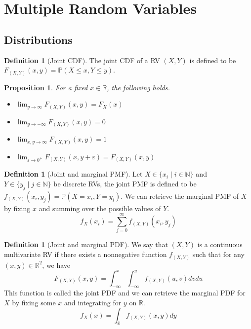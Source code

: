 \documentclass[paper=a4, fontsize=12pt]{scrartcl} %
\newtheorem{prop}[thm]{Proposition}
\theoremstyle{definition}
\newtheorem{defn}[thm]{Definition}
\theoremstyle{remark}
\newcommand{\R}{\mathbb{R}}
\newcommand{\N}{\mathbb{N}}
\renewcommand{\P}{\mathbb{P}}
\numberwithin{equation}{section} %
\numberwithin{figure}{section} %
\numberwithin{table}{section} %
\begin{document}
\section{Multiple Random Variables}
\subsection{Distributions}
\begin{defn}[Joint CDF]
	The joint CDF of a RV $(X,Y)$ is defined to be $F_{(X,Y)}(x,y) = \P( X \leq x, Y \leq y)$.
\end{defn}
\begin{prop}
	For a fixed $x \in \R$, the following holds.
	\begin{itemize}
		\item $\lim_{y \rightarrow \infty} F_{(X,Y)}(x,y) = F_X(x)$
		\item $\lim_{y \rightarrow -\infty} F_{(X,Y)}(x,y) = 0$
		\item $\lim_{x,y \rightarrow \infty} F_{(X,Y)}(x,y) = 1$
		\item $\lim_{\varepsilon\rightarrow 0^+} F_{(X,Y)}(x,y+\varepsilon) = F_{(X,Y)}(x,y)$
	\end{itemize}
\end{prop}
\begin{defn}[Joint and marginal PMF]
	Let $X \in \{x_i \mid i \in \N\}$ and $Y \in \{y_j \mid j \in \N\}$ be discrete RVs, the joint PMF is defined to be $f_{(X,Y)}(x_i,y_j) = \P(X = x_i, Y = y_i)$. We can retrieve the marginal PMF of $X$ by fixing $x$ and summing over the possible values of $Y$. \[f_X(x_i) = \sum_{j = 0}^{\infty}f_{(X,Y)}(x_i,y_j)\]
\end{defn}
\begin{defn}[Joint and marginal PDF]
	We say that $(X,Y)$ is a continuous multivariate RV if there exists a nonnegative function $f_{(X,Y)}$ such that for any $(x,y) \in \R^2$, we have
	\[ F_{(X,Y)}(x,y) = \int_{-\infty}^x \int_{-\infty}^y f_{(X,Y)}(u,v)dvdu \]
	This function is called the joint PDF and we can retrieve the marginal PDF for $X$ by fixing some $x$ and integrating for $y$ on $\R$.
	\[ f_X(x) = \int_{\R} f_{(X,Y)}(x,y)dy \]
\end{defn}
\end{document}
